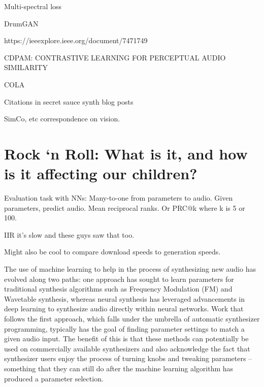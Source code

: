 Multi-spectral loss \cite{wang2019neural}

DrumGAN \cite{nistal2020drumgan}

https://ieeexplore.ieee.org/document/7471749

CDPAM: CONTRASTIVE LEARNING FOR PERCEPTUAL AUDIO SIMILARITY

COLA

Citations in secret sauce synth blog posts

SimCo, etc correspondence on vision.

\section{Rock `n Roll: What is it, and how is it affecting our children?}

Evaluation task with NNs: Many-to-one from parameters to audio. Given parameters, predict audio. Mean reciprocal ranks. Or PRC@k where k is 5 or 100.

IIR it's slow and these guys saw that too.

Might also be cool to compare download speeds to generation speeds.


The use of machine learning to help in the process of synthesizing new audio has evolved along two paths: one approach has sought to learn parameters for traditional synthesis algorithms such as Frequency Modulation (FM) and Wavetable synthesis, whereas neural synthesis has leveraged advancements in deep learning to synthesize audio directly within neural networks. Work that follows the first approach, which falls under the umbrella of automatic synthesizer programming, typically has the goal of finding parameter settings to match a given audio input. The benefit of this is that these methods can potentially be used on commercially available synthesizers and also acknowledge the fact that synthesizer users enjoy the process of turning knobs and tweaking parameters – something that they can still do after the machine learning algorithm has produced a parameter selection. 
\fi
